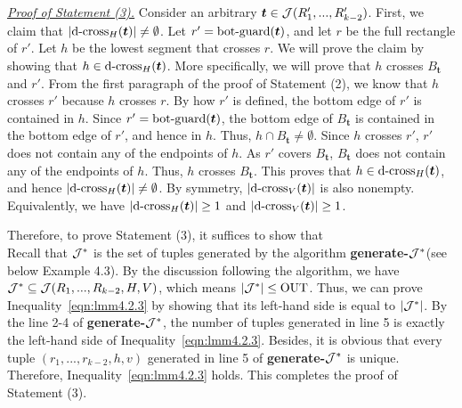 



\vgap 


\noindent \underline{\em Proof of Statement (3).} Consider an arbitrary $\textrm{\boldmath${t}$} \in \mathcal{J}(R_1',...,R_{k-2}')$. First, we claim that $|\mathrm{d\text{-}cross}_H(\textrm{\boldmath${t}$})| \neq \emptyset$. Let $r' = \mathrm{bot\text{-}guard}(\textrm{\boldmath${t}$})$, and let $r$ be the full rectangle of $r'$. Let $h$ be the lowest segment that crosses $r$. We will prove the claim by showing that $h \in \mathrm{d\text{-}cross}_H(\textrm{\boldmath${t}$})$. More specifically, we will prove that $h$ crosses $B_{\bm{t}}$ and $r'$. From the first paragraph of the proof of Statement (2), we know that $h$ crosses $r'$ because $h$ crosses $r$.
By how $r'$ is defined, the bottom edge of $r'$ is contained in $h$. Since $r' = \mathrm{bot\text{-}guard}(\textrm{\boldmath${t}$})$, the bottom edge of $B_\bm{t}$ is contained in the bottom edge of $r'$, and hence in $h$. Thus, $h \cap B_{\bm{t}}\neq \emptyset$. Since $h$ crosses $r'$, $r'$ does not contain any of the endpoints of $h$. As $r'$ covers $B_{\bm{t}}$, $B_{\bm{t}}$ does not contain any of the endpoints of $h$. Thus, $h$ crosses $B_{\bm{t}}$. This proves that $h \in \mathrm{d\text{-}cross}_H(\textrm{\boldmath${t}$})$, and hence $|\mathrm{d\text{-}cross}_H(\textrm{\boldmath${t}$})| \neq \emptyset$. By symmetry, $|\mathrm{d\text{-}cross}_V(\textrm{\boldmath${t}$})|$ is also nonempty. Equivalently, we have $|\mathrm{d\text{-}cross}_H(\textrm{\boldmath${t}$})| \geq 1$ and $|\mathrm{d\text{-}cross}_V(\textrm{\boldmath${t}$})| \geq 1$.

\vgap 

Therefore, to prove Statement (3),
it suffices to show that \\
 Recall that $\mathcal{J}^*$ is the set of tuples generated by the algorithm \textbf{generate-$\mathcal{J}^*$}(see below Example 4.3). By the discussion following the algorithm, we have $\mathcal{J}^*\subseteq \mathcal{J}(R_1,...,R_{k-2},H,V)$, which means $|\mathcal{J}^*|\leq \mathrm{OUT}$. Thus, we can prove Inequality~\eqref{eqn:lmm4.2.3} by showing that its left-hand side is equal to $|\mathcal{J}^*|$.
 By the line 2-4 of \textbf{generate-$\mathcal{J}^*$}, the number of tuples generated in line 5 is exactly the left-hand side of Inequality~\eqref{eqn:lmm4.2.3}.
Besides, it is obvious that every tuple $(r_1,...,r_{k-2},h,v)$ generated in line 5 of \textbf{generate-$\mathcal{J}^*$} is unique. Therefore, Inequality~\eqref{eqn:lmm4.2.3} holds. This completes the proof of Statement (3). 